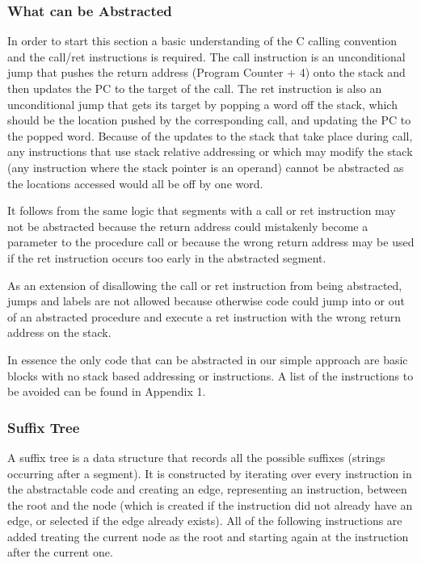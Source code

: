 \documentclass[9pt,nocopyrightspace]{sigplanconf}
\begin{document}
\subsubsection{What can be Abstracted}

In order to start this section a basic understanding of the C calling convention and the call/ret instructions is required.
The call instruction is an unconditional jump that pushes the return address (Program Counter + 4) onto the stack and then updates the PC to the target of the call.
The ret instruction is also an unconditional jump that gets its target by popping a word off the stack, which should be the location pushed by the corresponding call, and updating the PC to the popped word.
Because of the updates to the stack that take place during call, any instructions that use stack relative addressing or which may modify the stack (any instruction where the stack pointer is an operand) cannot be abstracted as the locations accessed would all be off by one word.

It follows from the same logic that segments with a call or ret instruction may not be abstracted because the return address could mistakenly become a parameter to the procedure call or because the wrong return address may be used if the ret instruction occurs too early in the abstracted segment.

As an extension of disallowing the call or ret instruction from being abstracted, jumps and labels are not allowed because otherwise code could jump into or out of an abstracted procedure and execute a ret instruction with the wrong return address on the stack.

In essence the only code that can be abstracted in our simple approach are basic blocks with no stack based addressing or instructions.
A list of the instructions to be avoided can be found in Appendix 1.

\subsubsection{Suffix Tree}

A suffix tree is a data structure that records all the possible suffixes (strings occurring after a segment).
It is constructed by iterating over every instruction in the abstractable code and creating an edge, representing an instruction, between the root and the node (which is created if the instruction did not already have an edge, or selected if the edge already exists).
All of the following instructions are added treating the current node as the root and starting again at the instruction after the current one.
\end{document}
